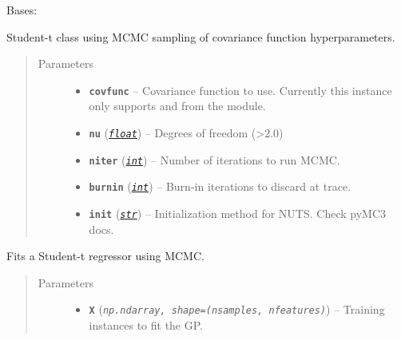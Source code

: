 \documentclass[letterpaper,10pt,english]{sphinxmanual}
\begin{document}
\begin{fulllineitems}
\label{pyGPGO.surrogates.tStudentProcessMCMC:pyGPGO.surrogates.tStudentProcessMCMC.tStudentProcessMCMC}
Bases: \href{https://docs.python.org/2/library/functions.html\#object}{}

Student-t class using MCMC sampling of covariance function hyperparameters.
\begin{quote}\begin{description}
\item[{Parameters}] \leavevmode\begin{itemize}
\item {} 
\textbf{\texttt{covfunc}} -- Covariance function to use. Currently this instance only supports 
and  from the  module.

\item {} 
\textbf{\texttt{nu}} (\href{https://docs.python.org/2/library/functions.html\#float}{\emph{\texttt{float}}}) -- Degrees of freedom (\textgreater{}2.0)

\item {} 
\textbf{\texttt{niter}} (\href{https://docs.python.org/2/library/functions.html\#int}{\emph{\texttt{int}}}) -- Number of iterations to run MCMC.

\item {} 
\textbf{\texttt{burnin}} (\href{https://docs.python.org/2/library/functions.html\#int}{\emph{\texttt{int}}}) -- Burn-in iterations to discard at trace.

\item {} 
\textbf{\texttt{init}} (\href{https://docs.python.org/2/library/functions.html\#str}{\emph{\texttt{str}}}) -- Initialization method for NUTS. Check pyMC3 docs.

\end{itemize}

\end{description}\end{quote}

\begin{fulllineitems}
\label{pyGPGO.surrogates.tStudentProcessMCMC:pyGPGO.surrogates.tStudentProcessMCMC.tStudentProcessMCMC.fit}
Fits a Student-t regressor using MCMC.
\begin{quote}\begin{description}
\item[{Parameters}] \leavevmode\begin{itemize}
\item {} 
\textbf{\texttt{X}} (\emph{\texttt{np.ndarray, shape=(nsamples, nfeatures)}}) -- Training instances to fit the GP.


\end{itemize}
\end{description}
\end{quote}
\end{fulllineitems}
\end{fulllineitems}
\end{document}
